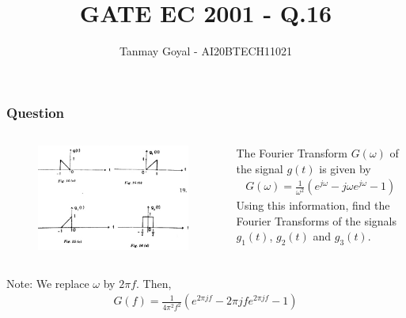 \documentclass{beamer}
\title{GATE EC 2001 - Q.16}
\author{Tanmay Goyal - AI20BTECH11021}
\date{}
\begin{document}
\begin{frame}
\titlepage
\end{frame}
\begin{frame}
\frametitle{Question}
\begin{flushleft} 
\begin{columns}
\begin{column}{0.5\textwidth}
\begin{figure}[!ht]
\centering
 \includegraphics[width=\columnwidth]{Question.png}
\end{figure}
\end{column}
\begin{column}{0.5\textwidth}
The Fourier Transform $G(\omega)$ of the signal $g(t)$ is given by 
\begin{align}
    G(\omega) = \frac{1}{\omega^2}(e^{j\omega} - j\omega e^{j\omega} - 1)
\end{align}
Using this information, find the Fourier Transforms of the signals $g_1(t)$, $g_2(t)$ and $g_3(t)$.
\end{column}
\end{columns}

Note: We replace $\omega$ by $2\pi f$.
Then, 
\begin{align}
    G(f) = \frac{1}{4\pi^2 f^2}(e^{2\pi jf} - 2\pi jf e^{2\pi jf} -1)
\end{align}\\
 
\end{flushleft}
\end{frame}
\end{document}
